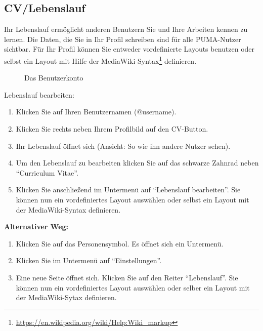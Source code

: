 \subsection{CV/Lebenslauf}
Ihr Lebenslauf ermöglicht anderen Benutzern Sie und Ihre Arbeiten kennen zu lernen. Die Daten, die Sie in Ihr Profil schreiben sind für alle PUMA-Nutzer sichtbar. Für Ihr Profil können Sie entweder vordefinierte Layouts benutzen oder selbst ein Layout mit Hilfe der MediaWiki-Syntax\footnote{\url{https://en.wikipedia.org/wiki/Help:Wiki_markup}} definieren. 
\begin{figure}[h!]
 \centering
 \caption{Das Benutzerkonto}
 \label{figure3}
\end{figure}  
Lebenslauf bearbeiten: 
\begin{enumerate}
    \item Klicken Sie auf Ihren Benutzernamen (@username).
    \item Klicken Sie rechts neben Ihrem Profilbild auf den CV-Button.
    \item Ihr Lebenslauf öffnet sich (Ansicht: So wie ihn andere Nutzer sehen).
    \item Um den Lebenslauf zu bearbeiten klicken Sie auf das schwarze Zahnrad neben \enquote{Curriculum Vitae}.
    \item Klicken Sie anschließend im Untermenü auf \enquote{Lebenslauf bearbeiten}. Sie können nun ein vordefiniertes Layout auswählen oder selbst ein Layout mit der MediaWiki-Syntax definieren.
\end{enumerate}
\textbf{Alternativer Weg:} 
\begin{enumerate}
    \item Klicken Sie auf das Personensymbol. Es öffnet sich ein Untermenü.
    \item Klicken Sie im Untermenü auf \enquote{Einstellungen}.
    \item Eine neue Seite öffnet sich. Klicken Sie auf den Reiter \enquote{Lebenslauf}. Sie können nun ein vordefiniertes Layout auswählen oder selber ein Layout mit der MediaWiki-Sytax definieren.
\end{enumerate}
